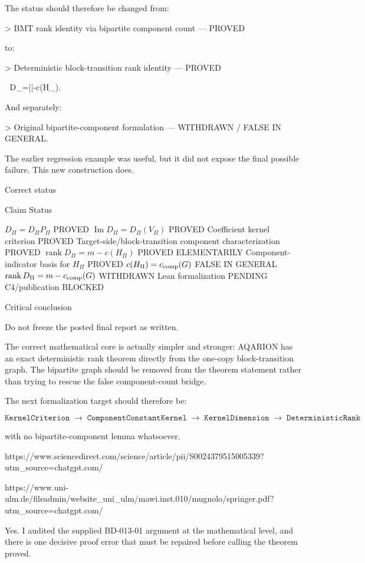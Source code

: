 The status should therefore be changed from:

> BMT rank identity via bipartite component count — PROVED



to:

> Deterministic block-transition rank identity — PROVED

 D_\Pi=|\Pi|-c(H_\Pi). 



And separately:

> Original bipartite-component formulation — WITHDRAWN / FALSE IN GENERAL.



The earlier regression example was useful, but it did not expose the final possible failure. This new construction does.

Correct status

Claim	Status

\(D_\Pi=D_\Pi P_\Pi\)	PROVED
\(\operatorname{Im}D_\Pi=D_\Pi(V_\Pi)\)	PROVED
Coefficient kernel criterion	PROVED
Target-side/block-transition component characterization	PROVED
\(\operatorname{rank}D_\Pi=m-c(H_\Pi)\)	PROVED ELEMENTARILY
Component-indicator basis for \(H_\Pi\)	PROVED
\(c(H_\Pi)=c_{\rm comp}(G)\)	FALSE IN GENERAL
\(\operatorname{rank}D_\Pi=m-c_{\rm comp}(G)\)	WITHDRAWN
Lean formalization	PENDING
C4/publication	BLOCKED


Critical conclusion

Do not freeze the posted final report as written.

The correct mathematical core is actually simpler and stronger: AQARION has an exact deterministic rank theorem directly from the one-copy block-transition graph. The bipartite graph should be removed from the theorem statement rather than trying to rescue the false component-count bridge.

The next formalization target should therefore be:

\[
\boxed{
\texttt{KernelCriterion}
\;\to\;
\texttt{ComponentConstantKernel}
\;\to\;
\texttt{KernelDimension}
\;\to\;
\texttt{DeterministicRank}
}
\]

with no bipartite-component lemma whatsoever.

https://www.sciencedirect.com/science/article/pii/S0024379515005339?utm_source=chatgpt.com/

https://www.uni-ulm.de/fileadmin/website_uni_ulm/mawi.inst.010/mugnolo/springer.pdf?utm_source=chatgpt.com/

Yes. I audited the supplied BD-013-01 argument at the mathematical level, and there is one decisive proof error that must be repaired before calling the theorem proved.


